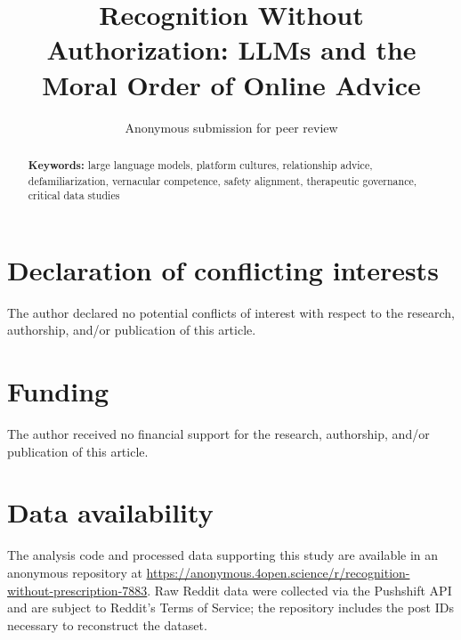 \documentclass[12pt,a4paper]{article}
\title{Recognition Without Authorization: LLMs and the Moral Order of Online Advice}
\author{Anonymous submission for peer review}
\date{}
\begin{document}
\maketitle

\begin{abstract}
\noindent


\bigskip
\noindent\textbf{Keywords:} large language models, platform cultures, relationship advice, defamiliarization, vernacular competence, safety alignment, therapeutic governance, critical data studies
\end{abstract}

\newpage









\section*{Declaration of conflicting interests}
The author declared no potential conflicts of interest with respect to the research, authorship, and/or publication of this article.

\section*{Funding}
The author received no financial support for the research, authorship, and/or publication of this article.

\section*{Data availability}
The analysis code and processed data supporting this study are available in an anonymous repository at \url{https://anonymous.4open.science/r/recognition-without-prescription-7883}. Raw Reddit data were collected via the Pushshift API and are subject to Reddit's Terms of Service; the repository includes the post IDs necessary to reconstruct the dataset.


\end{document}
